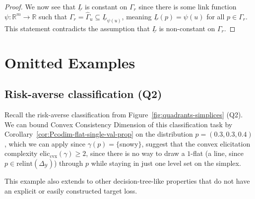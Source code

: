 \documentclass[11pt]{article} %
\newcommand{\reals}{\mathbb{R}}
\newcommand{\simplex}{\Delta_\Y}
\newcommand{\relint}[1]{\mathrm{relint}(#1)}
\newcommand{\eliccvx}{\mathrm{elic}_\mathrm{cvx}}
\newcommand{\Y}{\mathcal{Y}}
\newcommand{\lbar}{\underline{L}} %
\begin{document}
\begin{proof}
  We now see that $\lbar$ is constant on $\Gamma_r$ since there is some link function $\psi:\reals^m\to\reals$ such that $\Gamma_r = \hat\Gamma_u \subseteq \lbar_{\psi(u)}$, meaning $\lbar(p) = \psi(u)$ for all $p\in\Gamma_r$.
  This statement contradicts the assumption that $\lbar$ is non-constant on $\Gamma_r$.
\end{proof}



\section{Omitted Examples}\label{app:omitted-examples}
\subsection{Risk-averse classification (Q2)}

Recall the risk-averse classification from Figure~\ref{fig:quadrants-simplices} (Q2).
We can bound Convex Consistency Dimension of this classification task by Corollary~\ref{cor:Pcodim-flat-single-val-prop} on the distribution $p = (0.3,0.3,0.4)$, which we can apply since $\gamma(p) = \{$snowy$\}$, suggest that the convex elicitation complexity $\eliccvx(\gamma) \geq 2$, since there is no way to draw a $1$-flat (a line, since $p \in \relint{\simplex}$) through $p$ while staying in just one level set on the simplex.

This example also extends to other decision-tree-like properties that do not have an explicit or easily constructed target loss.
\end{document}
